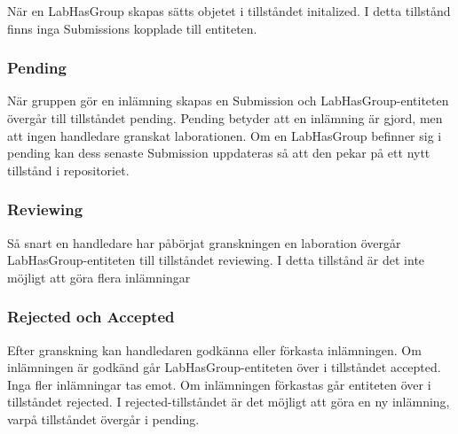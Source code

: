 När en LabHasGroup skapas sätts objetet i tillståndet initalized. I detta tillstånd finns inga Submissions kopplade till entiteten.

\subsubsection{Pending}

När gruppen gör en inlämning skapas en Submission och LabHasGroup-entiteten övergår till tillståndet pending. Pending betyder att en inlämning är gjord, men att ingen handledare granskat laborationen.
Om en LabHasGroup befinner sig i pending kan dess senaste Submission uppdateras så att den pekar på ett nytt tillstånd i repositoriet.

\subsubsection{Reviewing}

Så snart en handledare har påbörjat granskningen en laboration övergår LabHasGroup-entiteten till tillståndet reviewing. I detta tillstånd är det inte möjligt att göra flera inlämningar

\subsubsection{Rejected och Accepted}

Efter granskning kan handledaren godkänna eller förkasta inlämningen. Om inlämningen är godkänd går LabHasGroup-entiteten över i tillståndet accepted. Inga fler inlämningar tas emot. Om inlämningen förkastas går entiteten över i tillståndet rejected. I rejected-tillståndet är det möjligt att göra en ny inlämning, varpå tillståndet övergår i pending.